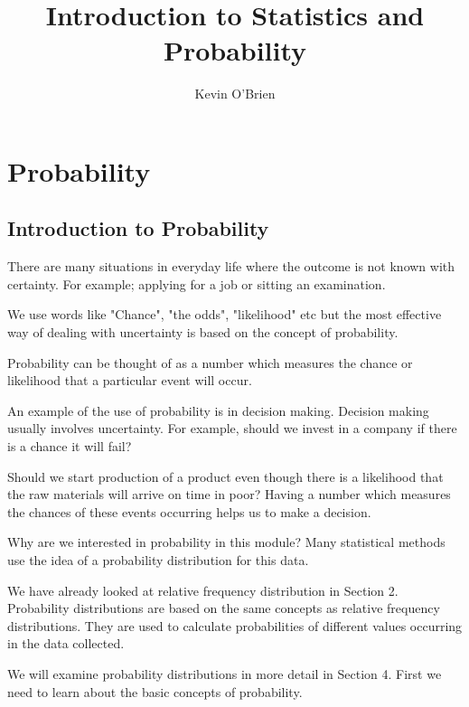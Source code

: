 \documentclass[12pt]{article}
\title{Introduction to Statistics and Probability}
\author{Kevin O'Brien}
\begin{document}
\maketitle
\newpage
\tableofcontents




\newpage
\section{Probability}

\subsection{Introduction to Probability}

There are many situations in everyday life where the outcome is not known with certainty. For example; applying for a job or sitting an examination.

We use words like "Chance", "the odds", "likelihood" etc but the most effective way of dealing with uncertainty is based on the concept of probability.

Probability can be thought of as a number which measures the chance or likelihood that a particular event will occur.


An example of the use of probability is in decision making. Decision making usually involves uncertainty. For example, should we invest in a company if there is a chance it will fail? 

Should we start production of a product even though there is a likelihood that the raw materials will arrive on time in poor? Having a number which measures the chances of these events occurring helps us to make a decision.



Why are we interested in probability in this module? Many statistical methods use the idea of a probability distribution for this data.

We have already looked at relative frequency distribution in Section 2. Probability distributions are based on the same concepts as relative frequency distributions. They are used to calculate probabilities of different values occurring in the data collected.

We will examine probability distributions in more detail in Section 4. First we need to learn about the basic concepts of probability.
\end{document}
